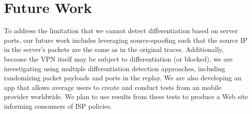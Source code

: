 \documentclass[letterpaper]{sig-alternate-2013}
\begin{document}
%



\section{Future Work}

To address the limitation that we cannot detect differentiation based on server ports, our future work includes leveraging source-spoofing such that the source IP in the server's packets are the same as in the original traces. Additionally, because the VPN itself may be subject to differentiation (or blocked), we are investigating using multiple differentiation detection approaches, including randomizing packet payloads and ports in the replay.
%
We are also developing an app that allows average users to create and conduct tests from an mobile provider worldwide. We plan to use results from these tests to produce a Web site informing consumers of ISP policies.


\begin{small}
	
	
\end{small}
\end{document}
